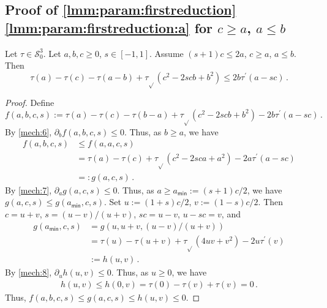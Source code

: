 \documentclass{article}
\newcommand*{\mc}[1]{\mathcal{#1}}
\newcommand*{\ms}[1]{\mathsf{#1}}
\newcommand{\pr}{^\prime}
\newcommand{\equationFullstop}{\, .}
\newcommand{\eqfs}{\equationFullstop}
\newcommand{\tran}{\tau}
\newcommand{\trans}{\tran_{\!\sqrt{}}}
\newcommand{\dtran}{\tran\pr}
\newcommand{\setccod}[1]{\mc S_0^{#1}}
\begin{document}
\begin{appendix}
\subsection{Proof of \cref{lmm:param:firstreduction} \ref{lmm:param:firstreduction:a} for $c \geq a$, $a \leq b$}\label{ssec:reduicGaLb}
%
\begin{lemma}\label{lmm:param:reduicGaLb}
	Let $\tran\in\setccod3$.
	Let $a,b,c\geq0$, $s\in[-1,1]$.
	Assume $(s+1)c\leq 2a$, $c \geq a$, $a \leq b$.
	Then
	\begin{equation*}
		\tran(a)-\tran(c)-\tran(a-b)+\trans(c^2-2scb+b^2) 
		\leq
		2 b \dtran(a - sc) 
		\eqfs
	\end{equation*}
\end{lemma}
%
\begin{proof}
	Define
	\begin{equation*}
		f(a,b,c,s) := \tran(a)-\tran(c)-\tran(b-a)+\trans(c^2-2scb+b^2) - 2 b \dtran(a - sc)
		\eqfs
	\end{equation*}
	By \cref{mech:6}, $\partial_b f(a,b,c,s)\leq0$. Thus, as $b \geq a$, we have 
	\begin{align*}
		f(a,b,c,s) 
		&\leq 
		f(a,a,c,s) 
		\\&= 
		\tran(a)-\tran(c)+\trans(c^2-2sca+a^2) - 2 a \dtran(a - sc) 
		\\&=: 
		g(a,c,s)
		\eqfs
	\end{align*}
	By \cref{mech:7}, $\partial_a g(a,c,s) \leq 0$. Thus, as $a \geq a_{\ms{min}} := (s+1)c/2$, we have $g(a,c,s) \leq g(a_{\ms{min}},c,s)$.
	Set $u := (1+s)c/2$, $v := (1-s)c/2$. Then $c = u+v$, $s = (u-v)/(u+v)$, $sc = u-v$, $u-sc=v$, and
	\begin{align*}
		g(a_{\ms{min}},c,s) 
		&=
		g(u, u+v, (u-v)/(u+v)) 
		\\&=
		\tran(u)-\tran(u+v)+\trans(4uv + v^2) - 2 u \dtran(v) 
		\\&:=
		h(u, v)
		\eqfs
	\end{align*}
	By \cref{mech:8}, $\partial_u h(u, v) \leq 0$. Thus, as $u \geq 0$, we have 
	\begin{align*}
		h(u, v) \leq h(0, v) = \tran(0) - \tran(v) + \tran(v) = 0 
		\eqfs
	\end{align*}
	Thus, $f(a,b,c,s) \leq g(a,c,s) \leq h(u, v) \leq 0$.
\end{proof}
%
%
%
%
%

\end{appendix}
\end{document}
